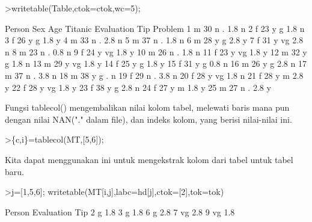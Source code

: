 \documentclass[a4paper,10pt]{article}
\begin{document}
\begin{eulernotebook}
\begin{eulerprompt}
>writetable(Table,ctok=ctok,wc=5);
\end{eulerprompt}
\begin{euleroutput}
   Person  Sex  Age Titanic Evaluation  Tip Problem
        1    m   30       n          .  1.8       n
        2    f   23       y          g  1.8       n
        3    f   26       y          g  1.8       y
        4    m   33       n          .  2.8       n
        5    m   37       n          .  1.8       n
        6    m   28       y          g  2.8       y
        7    f   31       y         vg  2.8       n
        8    m   23       n          .  0.8       n
        9    f   24       y         vg  1.8       y
       10    m   26       n          .  1.8       n
       11    f   23       y         vg  1.8       y
       12    m   32       y          g  1.8       n
       13    m   29       y         vg  1.8       y
       14    f   25       y          g  1.8       y
       15    f   31       y          g  0.8       n
       16    m   26       y          g  2.8       n
       17    m   37       n          .  3.8       n
       18    m   38       y          g    .       n
       19    f   29       n          .  3.8       n
       20    f   28       y         vg  1.8       n
       21    f   28       y          m  2.8       y
       22    f   28       y         vg  1.8       y
       23    f   38       y          g  2.8       n
       24    f   27       y          m  1.8       y
       25    m   27       n          .  2.8       y
\end{euleroutput}
\begin{eulercomment}
Fungsi tablecol() mengembalikan nilai kolom tabel, melewati baris mana
pun dengan nilai NAN("." dalam file), dan indeks kolom, yang berisi
nilai-nilai ini.
\end{eulercomment}
\begin{eulerprompt}
>\{c,i\}=tablecol(MT,[5,6]);
\end{eulerprompt}
\begin{eulercomment}
Kita dapat menggunakan ini untuk mengekstrak kolom dari tabel untuk
tabel baru.
\end{eulercomment}
\begin{eulerprompt}
>j=[1,5,6]; writetable(MT[i,j],labc=hd[j],ctok=[2],tok=tok)
\end{eulerprompt}
\begin{euleroutput}
      Person Evaluation       Tip
           2          g       1.8
           3          g       1.8
           6          g       2.8
           7         vg       2.8
           9         vg       1.8

\end{euleroutput}
\end{eulernotebook}
\end{document}

